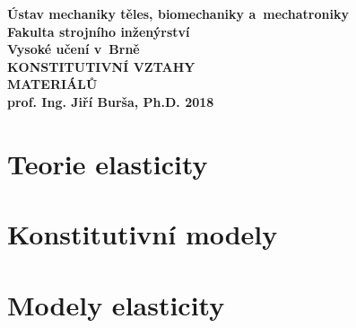 \documentclass[a4paper, 10pt, oneside]{report}
\numberwithin{equation}{part}
\begin{document}
\begin{titlepage}
\pagecolor{fsimodra}
\color{white}
\renewcommand{\thepage}{Cover}
\centering
\bfseries
{Ústav mechaniky těles, biomechaniky a~mechatroniky\\Fakulta strojního inženýrství\\Vysoké učení v~Brně\\}
\vfill
{\Huge KONSTITUTIVNÍ VZTAHY\\MATERIÁLŮ\\}
\vfill
{\LARGE prof. Ing. Jiří Burša, Ph.D.}
\vfill
2018
\end{titlepage}

\clearpage
\nopagecolor
\color{black}
\tableofcontents

\clearpage
{}
\chapter{Teorie elasticity}


















%

\chapter{Konstitutivní modely}









\chapter{Modely elasticity}


















\end{document}
